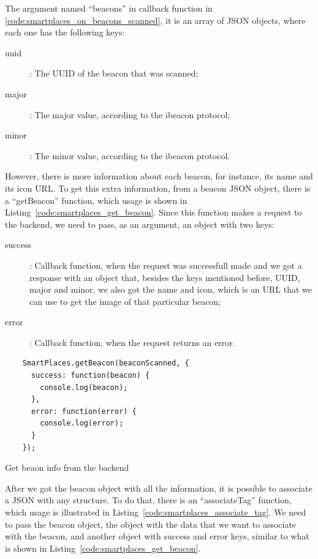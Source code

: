 The argument named ``beacons'' in callback function in \ref{code:smartplaces_on_beacons_scanned}, it is an array of \gls{JSON} objects, where each one has the following keys:
\begin{description}
  \item[uuid]: The \gls{UUID} of the beacon that was scanned;
  \item[major]: The major value, according to the ibeacon protocol;
  \item[minor]: The minor value, according to the ibeacon protocol.
\end{description}

However, there is more information about each beacon, for instance, its name and its icon \gls{URL}.
To get this extra information, from a beacon \gls{JSON} object, there is a ``getBeacon'' function, which usage is shown in Listing~\ref{code:smartplaces_get_beacon}.
Since this function makes a request to the backend, we need to pass, as an argument, an object with two keys:
\begin{description}
  \item[success]: Callback function, when the request was successfull made and we got a response with an object that, besides the keys mentioned before, \gls{UUID}, major and minor, we also got the name and icon, which is an \gls{URL} that we can use to get the image of that particular beacon;
  \item[error]: Callback function, when the request returns an error.
\end{description}

\begin{listing}[H]
  \begin{verbatim}
    SmartPlaces.getBeacon(beaconScanned, {
      success: function(beacon) {
        console.log(beacon);
      },
      error: function(error) {
        console.log(error);
      }
    });
  \end{verbatim}
  \caption{Get beaon info from the backend}
  \label{code:smartplaces_get_beacon}
\end{listing}

After we got the beacon object with all the information, it is possible to associate a \gls{JSON} with any structure.
To do that, there is an ``associateTag'' function, which usage is illustrated in Listing~\ref{code:smartplaces_associate_tag}. We need to pass the beacon object, the object with the data that we want to associate with the beacon, and another object with success and error keys, similar to what is shown in Listing~\ref{code:smartplaces_get_beacon}.

